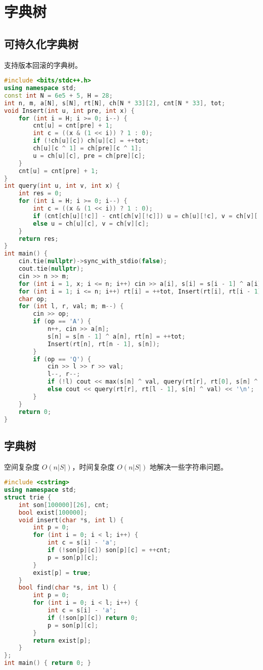 \documentclass[9pt, a4paper, oneside]{book}
\begin{document}
\section{字典树}
\subsection{可持久化字典树}
支持版本回滚的字典树。
\begin{lstlisting}[language={C++}]
#include <bits/stdc++.h>
using namespace std;
const int N = 6e5 + 5, H = 28;
int n, m, a[N], s[N], rt[N], ch[N * 33][2], cnt[N * 33], tot;
void Insert(int u, int pre, int x) {
    for (int i = H; i >= 0; i--) {
        cnt[u] = cnt[pre] + 1;
        int c = ((x & (1 << i)) ? 1 : 0);
        if (!ch[u][c]) ch[u][c] = ++tot;
        ch[u][c ^ 1] = ch[pre][c ^ 1];
        u = ch[u][c], pre = ch[pre][c];
    }
    cnt[u] = cnt[pre] + 1;
}
int query(int u, int v, int x) {
    int res = 0;
    for (int i = H; i >= 0; i--) {
        int c = ((x & (1 << i)) ? 1 : 0);
        if (cnt[ch[u][!c]] - cnt[ch[v][!c]]) u = ch[u][!c], v = ch[v][!c], res += (1 << i);
        else u = ch[u][c], v = ch[v][c];
    }
    return res;
}
int main() {
    cin.tie(nullptr)->sync_with_stdio(false);
    cout.tie(nullptr);
    cin >> n >> m;
    for (int i = 1, x; i <= n; i++) cin >> a[i], s[i] = s[i - 1] ^ a[i];
    for (int i = 1; i <= n; i++) rt[i] = ++tot, Insert(rt[i], rt[i - 1], s[i]);
    char op;
    for (int l, r, val; m; m--) {
        cin >> op;
        if (op == 'A') {
            n++, cin >> a[n];
            s[n] = s[n - 1] ^ a[n], rt[n] = ++tot;
            Insert(rt[n], rt[n - 1], s[n]);
        }
        if (op == 'Q') {
            cin >> l >> r >> val;
            l--, r--;
            if (!l) cout << max(s[n] ^ val, query(rt[r], rt[0], s[n] ^ val)) << '\n';
            else cout << query(rt[r], rt[l - 1], s[n] ^ val) << '\n';
        }
    }
    return 0;
}\end{lstlisting}
\subsection{字典树}
空间复杂度 $O(n|S|)$，时间复杂度 $O(n|S|)$ 地解决一些字符串问题。
\begin{lstlisting}[language={C++}]
#include <cstring>
using namespace std;
struct trie {
    int son[100000][26], cnt;
    bool exist[100000];
    void insert(char *s, int l) {
        int p = 0;
        for (int i = 0; i < l; i++) {
            int c = s[i] - 'a';
            if (!son[p][c]) son[p][c] = ++cnt;
            p = son[p][c];
        }
        exist[p] = true;
    }
    bool find(char *s, int l) {
        int p = 0;
        for (int i = 0; i < l; i++) {
            int c = s[i] - 'a';
            if (!son[p][c]) return 0;
            p = son[p][c];
        }
        return exist[p];
    }
};
int main() { return 0; }\end{lstlisting}
\end{document}

